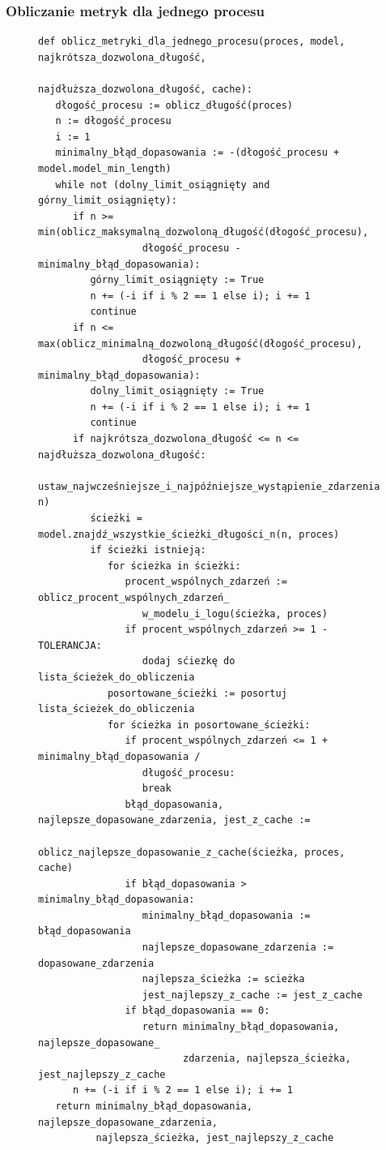 \subsubsection{Obliczanie metryk dla jednego procesu}
\clearpage
\begin{figure}[!ht]
\lstset{caption=Obliczanie metryk dla jednego procesu, captionpos=b}
\lstset{label=src:best_result, frame=single}
\begin{lstlisting}
def oblicz_metryki_dla_jednego_procesu(proces, model, najkrótsza_dozwolona_długość, 
				               najdłuższa_dozwolona_długość, cache):
   dłogość_procesu := oblicz_długość(proces)
   n := dłogość_procesu
   i := 1
   minimalny_błąd_dopasowania := -(dłogość_procesu + model.model_min_length)
   while not (dolny_limit_osiągnięty and górny_limit_osiągnięty):
      if n >= min(oblicz_maksymalną_dozwoloną_długość(dłogość_procesu), 
                  dłogość_procesu - minimalny_błąd_dopasowania):
         górny_limit_osiągnięty := True
         n += (-i if i % 2 == 1 else i); i += 1
         continue
      if n <= max(oblicz_minimalną_dozwoloną_długość(dłogość_procesu), 
                  dłogość_procesu + minimalny_błąd_dopasowania):
         dolny_limit_osiągnięty := True
         n += (-i if i % 2 == 1 else i); i += 1
         continue
      if najkrótsza_dozwolona_długość <= n <= najdłuższa_dozwolona_długość:
         ustaw_najwcześniejsze_i_najpóźniejsze_wystąpienie_zdarzenia(model, n)
         ścieżki = model.znajdź_wszystkie_ścieżki_długości_n(n, proces)
         if ścieżki istnieją:
            for ścieżka in ścieżki:
               procent_wspólnych_zdarzeń := oblicz_procent_wspólnych_zdarzeń_
                  w_modelu_i_logu(ścieżka, proces)
               if procent_wspólnych_zdarzeń >= 1 - TOLERANCJA:
                  dodaj sćiezkę do lista_ścieżek_do_obliczenia
            posortowane_ścieżki := posortuj lista_ścieżek_do_obliczenia
            for ścieżka in posortowane_ścieżki:
               if procent_wspólnych_zdarzeń <= 1 + minimalny_błąd_dopasowania /
                  długość_procesu:
                  break
               błąd_dopasowania, najlepsze_dopasowane_zdarzenia, jest_z_cache :=
                  oblicz_najlepsze_dopasowanie_z_cache(ścieżka, proces, cache)
               if błąd_dopasowania > minimalny_błąd_dopasowania:
                  minimalny_błąd_dopasowania := błąd_dopasowania
                  najlepsze_dopasowane_zdarzenia := dopasowane_zdarzenia
                  najlepsza_ścieżka := scieżka
                  jest_najlepszy_z_cache := jest_z_cache
               if błąd_dopasowania == 0:
                  return minimalny_błąd_dopasowania, najlepsze_dopasowane_
                         zdarzenia, najlepsza_ścieżka, jest_najlepszy_z_cache
      n += (-i if i % 2 == 1 else i); i += 1
   return minimalny_błąd_dopasowania, najlepsze_dopasowane_zdarzenia, 
          najlepsza_ścieżka, jest_najlepszy_z_cache
\end{lstlisting}
\end{figure}

